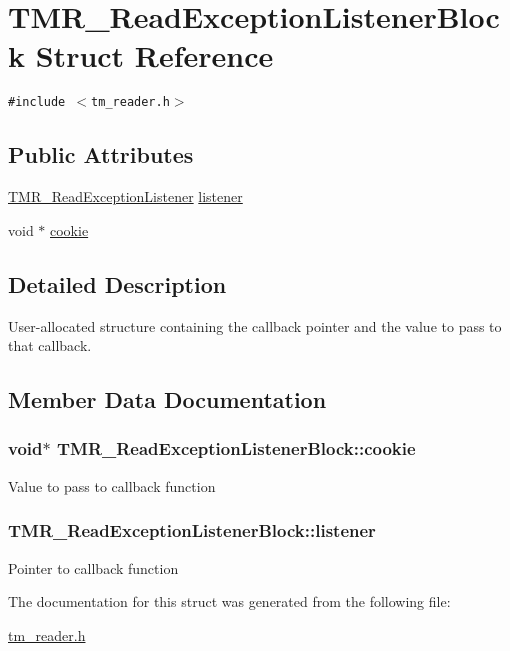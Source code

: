\hypertarget{struct_t_m_r___read_exception_listener_block}{
\section{TMR\_\-ReadExceptionListenerBlock Struct Reference}
\label{struct_t_m_r___read_exception_listener_block}
}
{\tt \#include $<$tm\_\-reader.h$>$}

\subsection*{Public Attributes}
\begin{CompactItemize}
\item 
\hyperlink{tm__reader_8h_c0b752a65cd4263cf4d71710d107e63a}{TMR\_\-ReadExceptionListener} \hyperlink{struct_t_m_r___read_exception_listener_block_3b7f120fd923f8c359ff00086d4104fe}{listener}
\item 
void $\ast$ \hyperlink{struct_t_m_r___read_exception_listener_block_d220811f037fe59367968409de71736d}{cookie}
\end{CompactItemize}


\subsection{Detailed Description}
User-allocated structure containing the callback pointer and the value to pass to that callback. 

\subsection{Member Data Documentation}
\hypertarget{struct_t_m_r___read_exception_listener_block_d220811f037fe59367968409de71736d}{
\subsubsection[{cookie}]{\setlength{\rightskip}{0pt plus 5cm}void$\ast$ {\bf TMR\_\-ReadExceptionListenerBlock::cookie}}}
\label{struct_t_m_r___read_exception_listener_block_d220811f037fe59367968409de71736d}


Value to pass to callback function \hypertarget{struct_t_m_r___read_exception_listener_block_3b7f120fd923f8c359ff00086d4104fe}{
\subsubsection[{listener}]{ {\bf TMR\_\-ReadExceptionListenerBlock::listener}}}
\label{struct_t_m_r___read_exception_listener_block_3b7f120fd923f8c359ff00086d4104fe}


Pointer to callback function 

The documentation for this struct was generated from the following file:\begin{CompactItemize}
\item 
\hyperlink{tm__reader_8h}{tm\_\-reader.h}\end{CompactItemize}
